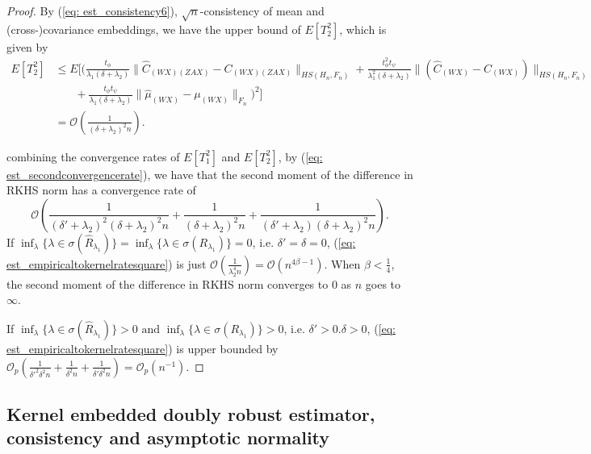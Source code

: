 \begin{proof}
    By (\ref{eq: est_consistency6}), $\sqrt{n}$-consistency of mean and (cross-)covariance embeddings,  
    we have the upper bound of $E[T_2^2]$, which is given by 
    \begin{align*}
        E[T_2^2] &\leq E\bigg[\bigg(\frac{t_{\phi}}{\lambda_1(\delta+\lambda_2)} \|\widehat{C}_{(WX)(ZAX)}-C_{(WX)(ZAX)}\|_{HS(H_n,F_n)} + \frac{t^2_{\phi}t_{\psi}}{\lambda^2_1(\delta+\lambda_2)}\|(\widehat{C}_{(WX)}-C_{(WX)})\|_{HS(H_n,F_n)} \\
                 & \phantom{text}+ \frac{t_{\phi}t_{\psi}}{\lambda_1(\delta+\lambda_2)}\|\widehat{\mu}_{(WX)}-\mu_{(WX)}\|_{F_n}\bigg)^2\bigg] \\
                 &=\mathcal{O}(\frac{1}{(\delta+\lambda_2)^2n}). 
    \end{align*}

    combining the convergence rates of $E[T_1^2]$ and $E[T_2^2]$, by (\ref{eq: est_secondconvergencerate}), 
    we have that the second moment of the difference in RKHS norm has a convergence rate of 
    \begin{equation}
        \label{eq: est_empiricaltokernelratesquare}
        \mathcal{O}(\frac{1}{(\delta'+\lambda_2)^2(\delta+\lambda_2)^2n}+\frac{1}{(\delta+\lambda_2)^2n}+\frac{1}{(\delta'+\lambda_2)(\delta+\lambda_2)^2n}). 
    \end{equation}
    If $\inf_{\lambda}\{\lambda\in\sigma(\widehat{R}_{\lambda_1})\} = \inf_{\lambda}\{\lambda\in\sigma(R_{\lambda_1})\} = 0$, i.e. $\delta'=\delta=0$, 
    (\ref{eq: est_empiricaltokernelratesquare}) is just $\mathcal{O}(\frac{1}{\lambda_2^4n})=\mathcal{O}(n^{4\beta-1})$.
    When $\beta<\frac{1}{4}$, the second moment of the difference in RKHS norm converges to 0 as $n$ goes to $\infty$. 

    If $\inf_{\lambda}\{\lambda\in\sigma(\widehat{R}_{\lambda_1})\}>0 \text{ and } \inf_{\lambda}\{\lambda\in\sigma(R_{\lambda_1})\} > 0$, i.e. $\delta'>0. \delta>0$, 
    (\ref{eq: est_empiricaltokernelratesquare}) is upper bounded by $\mathcal{O}_p(\frac{1}{\delta'^2\delta^2n}+\frac{1}{\delta^2n}+\frac{1}{\delta'\delta^2n})=\mathcal{O}_p(n^{-1})$.
\end{proof}

\subsection{Kernel embedded doubly robust estimator, consistency and asymptotic normality}

